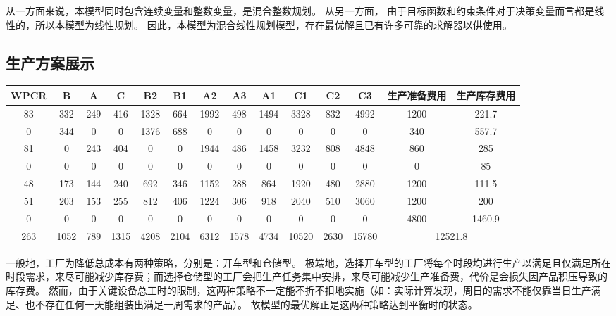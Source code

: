 从一方面来说，本模型同时包含连续变量和整数变量，是混合整数规划。
从另一方面， 由于目标函数和约束条件对于决策变量而言都是线性的，所以本模型为线性规划。
因此，本模型为混合线性规划模型，存在最优解且已有许多可靠的求解器以供使用。

\subsection{生产方案展示} %
\label{sub:生产方案展示}

\begin{table}
\centering
\begin{tabular}{cccccccccccccc}
\toprule
WPCR & B    & A   & C    & B2   & B1   & A2   & A3   & A1   & C1    & C2   & C3    & 生产准备费用 & 生产库存费用              \\
\midrule
83   & 332  & 249 & 416  & 1328 & 664  & 1992 & 498  & 1494 & 3328  & 832  & 4992  & 1200   & 221.7               \\
0    & 344  & 0   & 0    & 1376 & 688  & 0    & 0    & 0    & 0     & 0    & 0     & 340    & 557.7               \\
81   & 0    & 243 & 404  & 0    & 0    & 1944 & 486  & 1458 & 3232  & 808  & 4848  & 860    & 285                 \\
0    & 0    & 0   & 0    & 0    & 0    & 0    & 0    & 0    & 0     & 0    & 0     & 0      & 85                  \\
48   & 173  & 144 & 240  & 692  & 346  & 1152 & 288  & 864  & 1920  & 480  & 2880  & 1200   & 111.5               \\
51   & 203  & 153 & 255  & 812  & 406  & 1224 & 306  & 918  & 2040  & 510  & 3060  & 1200   & 200                 \\
0    & 0    & 0   & 0    & 0    & 0    & 0    & 0    & 0    & 0     & 0    & 0     & 4800   & 1460.9              \\
\cline{13-14}
263  & 1052 & 789 & 1315 & 4208 & 2104 & 6312 & 1578 & 4734 & 10520 & 2630 & 15780 & \multicolumn{2}{c}{12521.8}  \\
\bottomrule
\end{tabular}
\end{table}

一般地，工厂为降低总成本有两种策略，分别是：开车型和仓储型。
极端地，选择开车型的工厂将每个时段均进行生产以满足且仅满足所在时段需求，来尽可能减少库存费；而选择仓储型的工厂会把生产任务集中安排，来尽可能减少生产准备费，代价是会损失因产品积压导致的库存费。
然而，由于关键设备总工时的限制，这两种策略不一定能不折不扣地实施（如：实际计算发现，周日的需求不能仅靠当日生产满足、也不存在任何一天能组装出满足一周需求的产品）。
故模型的最优解正是这两种策略达到平衡时的状态。

